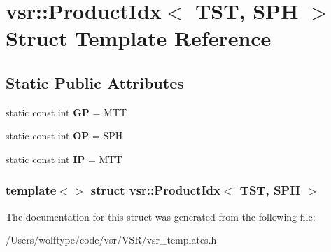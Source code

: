 \hypertarget{structvsr_1_1_product_idx_3_01_t_s_t_00_01_s_p_h_01_4}{\section{vsr\-:\-:Product\-Idx$<$ T\-S\-T, S\-P\-H $>$ Struct Template Reference}
\label{structvsr_1_1_product_idx_3_01_t_s_t_00_01_s_p_h_01_4}
}
\subsection*{Static Public Attributes}
\begin{DoxyCompactItemize}
\item 
\hypertarget{structvsr_1_1_product_idx_3_01_t_s_t_00_01_s_p_h_01_4_a5a2e2782cfa06683573fae9e9e088bbd}{static const int {\bfseries G\-P} = M\-T\-T}\label{structvsr_1_1_product_idx_3_01_t_s_t_00_01_s_p_h_01_4_a5a2e2782cfa06683573fae9e9e088bbd}

\item 
\hypertarget{structvsr_1_1_product_idx_3_01_t_s_t_00_01_s_p_h_01_4_a665f7a0befd72e2d94dd1cc7e63b84cb}{static const int {\bfseries O\-P} = S\-P\-H}\label{structvsr_1_1_product_idx_3_01_t_s_t_00_01_s_p_h_01_4_a665f7a0befd72e2d94dd1cc7e63b84cb}

\item 
\hypertarget{structvsr_1_1_product_idx_3_01_t_s_t_00_01_s_p_h_01_4_adf2cfc3a48ec8b625bcb5dc75d4573bc}{static const int {\bfseries I\-P} = M\-T\-T}\label{structvsr_1_1_product_idx_3_01_t_s_t_00_01_s_p_h_01_4_adf2cfc3a48ec8b625bcb5dc75d4573bc}

\end{DoxyCompactItemize}
\subsubsection*{template$<$$>$ struct vsr\-::\-Product\-Idx$<$ T\-S\-T, S\-P\-H $>$}



The documentation for this struct was generated from the following file\-:\begin{DoxyCompactItemize}
\item 
/\-Users/wolftype/code/vsr/\-V\-S\-R/vsr\-\_\-templates.\-h\end{DoxyCompactItemize}
